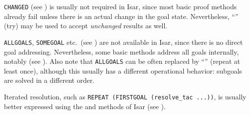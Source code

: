 \begin{isabellebody}
\begin{isamarkuptext}
  \medskip \verb|CHANGED| (see \cite{isabelle-implementation}) is
  usually not required in Isar, since most basic proof methods already
  fail unless there is an actual change in the goal state.
  Nevertheless, ``''  (try) may be used to accept
  \emph{unchanged} results as well.

  \medskip \verb|ALLGOALS|, \verb|SOMEGOAL| etc.\ (see
  \cite{isabelle-implementation}) are not available in Isar, since
  there is no direct goal addressing.  Nevertheless, some basic
  methods address all goals internally, notably \hyperlink{method.simp-all}{\mbox{}}
  (see ).  Also note that \verb|ALLGOALS| can be
  often replaced by ``'' (repeat at least once), although
  this usually has a different operational behavior: subgoals are
  solved in a different order.

  \medskip Iterated resolution, such as
  \verb|REPEAT (FIRSTGOAL (resolve_tac ...))|, is usually better
  expressed using the \hyperlink{method.intro}{\mbox{}} and \hyperlink{method.elim}{\mbox{}} methods of
  Isar (see ).%
\end{isamarkuptext}%
\isamarkuptrue%
%
\isadelimtheory
%
\endisadelimtheory
%
\isatagtheory
{}\isamarkupfalse%
%
\endisatagtheory
{\isafoldtheory}%
%
\isadelimtheory
%
\endisadelimtheory
\isanewline
\end{isabellebody}%
